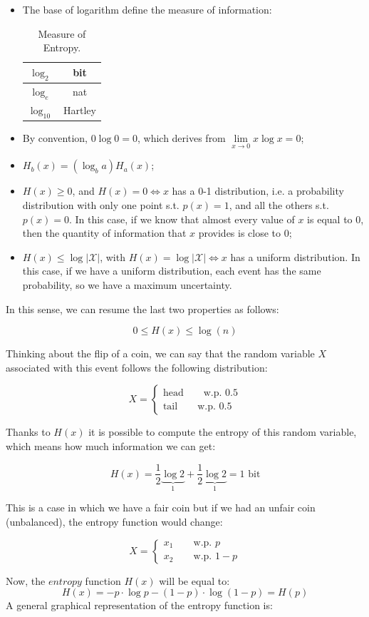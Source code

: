 \begin{itemize}
    \item The base of logarithm define the measure of information:
    \begin{table}[H]
	\centering
	\begin{tabular}{| c | c |}
		\hline
		$\log_2$ & bit\\
		\hline
		$\log_e$ & nat\\
		\hline
		$\log_{10}$ & Hartley\\
		\hline
	\end{tabular}
	\caption{Measure of Entropy.}
    \end{table}
    \item By convention, $0 \log 0 = 0$, which derives from $\lim\limits_{x\rightarrow 0}x \log x = 0$;
    \item $H_b(x) = (\log_b a) H_a(x)$;
    \item $H(x) \geq 0$, and $H(x) = 0 \iff x$ has a 0-1 distribution, i.e. a probability distribution with only one point s.t. $p(x) = 1$, and all the others s.t. $p(x) = 0$. In this case, if we know that almost every value of $x$ is equal to 0, then the quantity of information that $x$ provides is close to 0;
    \item $H(x) \leq \log |\mathcal{X}|$, with $H(x) = \log |\mathcal{X}| \iff x$ has a uniform distribution. In this case, if we have a uniform distribution, each event has the same probability, so we have a maximum uncertainty. 
\end{itemize}

In this sense, we can resume the last two properties as follows:

$$
0 \leq H(x) \leq \log(n)
$$


\begin{exmp} Thinking about the flip of a coin, we can say that the random variable $X$ associated with this event follows the following distribution:

$$
X =
\begin{cases}
\text{head} \qquad \text{w.p. } 0.5\\
\text{tail} \qquad \text{w.p. } 0.5
\end{cases}
$$

Thanks to $H(x)$ it is possible to compute the entropy of this random variable, which means how much information we can get:

$$
H(x) = \frac{1}{2} \underbrace{\log 2}_{1} + \frac{1}{2} \underbrace{\log 2}_{1} = 1 \text{ bit}
$$

This is a case in which we have a fair coin but if we had an unfair coin (unbalanced), the entropy function would change:

$$
X =
\begin{cases}
x_1 \qquad \text{w.p. } p\\
x_2 \qquad \text{w.p. } 1-p
\end{cases}
$$
\end{exmp}
Now, the $entropy$ function $H(x)$ will be equal to:
$$H(x) = -p \cdot \log p - (1-p) \cdot \log (1-p) = H(p)$$
A general graphical representation of the entropy function is:

